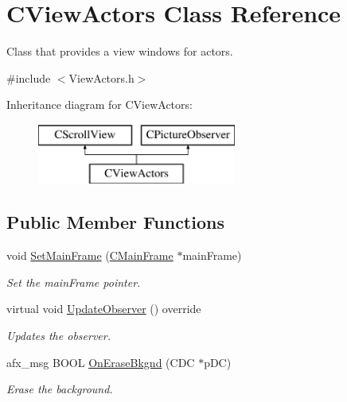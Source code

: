 \hypertarget{class_c_view_actors}{\section{C\+View\+Actors Class Reference}
\label{class_c_view_actors}
}


Class that provides a view windows for actors.  




{\ttfamily \#include $<$View\+Actors.\+h$>$}

Inheritance diagram for C\+View\+Actors\+:\begin{figure}[H]
\begin{center}
\leavevmode
\includegraphics[height=2.000000cm]{class_c_view_actors}
\end{center}
\end{figure}
\subsection*{Public Member Functions}
\begin{DoxyCompactItemize}
\item 
void \hyperlink{class_c_view_actors_a6f68ae9e71f6a195502464bf34b3e724}{Set\+Main\+Frame} (\hyperlink{class_c_main_frame}{C\+Main\+Frame} $\ast$main\+Frame)
\begin{DoxyCompactList}\small\item\em Set the main\+Frame pointer. \end{DoxyCompactList}\item 
virtual void \hyperlink{class_c_view_actors_a5014f8c616850b8e874dee895b2ba698}{Update\+Observer} () override
\begin{DoxyCompactList}\small\item\em Updates the observer. \end{DoxyCompactList}\item 
afx\+\_\+msg B\+O\+O\+L \hyperlink{class_c_view_actors_a561f4be212bd5df4a667c2cb0b23e472}{On\+Erase\+Bkgnd} (C\+D\+C $\ast$p\+D\+C)
\begin{DoxyCompactList}\small\item\em Erase the background. \end{DoxyCompactList}\end{DoxyCompactItemize}
